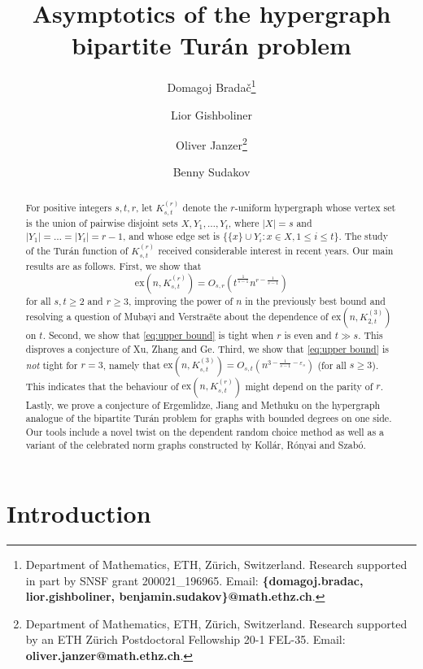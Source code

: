 \documentclass[a4paper,11pt]{article}
\title{}
\date{}
\author{
Domagoj Brada\v{c}\thanks{Department of Mathematics, ETH, Z\"urich, Switzerland. Research supported in part by SNSF grant 200021\_196965. Email: \textbf{\{domagoj.bradac, lior.gishboliner, benjamin.sudakov\}@math.ethz.ch}.}
\and 
Lior Gishboliner\footnotemark[1]
\and
Oliver Janzer\thanks{Department of Mathematics, ETH, Z\"urich, Switzerland. Research supported by an ETH Z\"urich Postdoctoral Fellowship 20-1 FEL-35. Email: \textbf{oliver.janzer@math.ethz.ch}.}
\and Benny Sudakov\footnotemark[1]
}
\title{Asymptotics of the hypergraph bipartite Tur\'an problem}
\theoremstyle{definition}
\def\ex{\mathrm{ex}}
\begin{document}
\maketitle

\begin{abstract}
    For positive integers $s,t,r$, let $K_{s,t}^{(r)}$ denote the $r$-uniform hypergraph whose vertex set is the union of pairwise disjoint sets $X,Y_1,\dots,Y_t$, where $|X| = s$ and $|Y_1| = \dots = |Y_t| = r-1$, and whose edge set is $\{\{x\} \cup Y_i: x \in X, 1\leq i\leq t\}$. The study of the Tur\'an function of $K_{s,t}^{(r)}$ received considerable interest in recent years. Our main results are as follows. First, we show \nolinebreak that
    \begin{equation}\label{eq:upper bound}
        \ex(n,K_{s,t}^{(r)}) = O_{s,r}(t^{\frac{1}{s-1}}n^{r - \frac{1}{s-1}})
    \end{equation}
    for all $s,t\geq 2$ and $r\geq 3$, improving the power of $n$ in the previously best bound and resolving a question of Mubayi and Verstra\"ete about the dependence of $\ex(n,K_{2,t}^{(3)})$ on $t$. Second, we show that \eqref{eq:upper bound} is tight when $r$ is even and $t \gg s$. This disproves a conjecture of Xu, Zhang and Ge. Third, we show that \eqref{eq:upper bound} is {\em not} tight for $r = 3$, namely that $\ex(n,K_{s,t}^{(3)}) = O_{s,t}(n^{3 - \frac{1}{s-1} - \varepsilon_s})$ (for all $s\geq 3$). This indicates that the behaviour of $\ex(n,K_{s,t}^{(r)})$ might depend on the parity of $r$. Lastly, we prove a conjecture of Ergemlidze, Jiang and Methuku on the hypergraph analogue of the bipartite Tur\'an problem for graphs with bounded degrees on one side. Our tools include a novel twist on the dependent random choice method as well as a variant of the celebrated norm graphs constructed by Koll{\'a}r, R{\'o}nyai and Szab{\'o}.
\end{abstract}

\section{Introduction}
\end{document}
